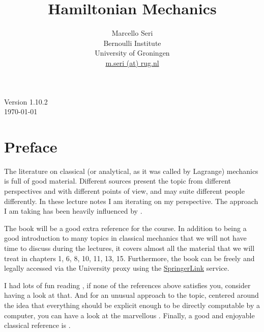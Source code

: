 \documentclass[english,fontsize=11pt,paper=a5,oneside]{scrbook}
\title{Hamiltonian Mechanics}
\author{Marcello Seri\\
\small{Bernoulli Institute}\vspace{-.2cm}\\
\small{University of Groningen}\vspace{-.2cm}\\
\small\href{mailto:m.seri@rug.nl}{m.seri (at) rug.nl}
}
\date{}
\theoremstyle{definition}
\def\biblio{}
\begin{document}
\def\biblio{}

\maketitle

\cleardoublepage

\thispagestyle{empty}
\null\vfill
\begin{center}
  Version 1.10.2\\
  \today
\end{center}
\vfill
\small{\doclicenseThis}

\cleardoublepage

\tableofcontents

\cleardoublepage

\chapter*{Preface}

The literature on classical (or analytical, as it was called by Lagrange) mechanics is full of good material.
Different sources present the topic from different perspectives and with different points of view, and may suite different people differently.
In these lecture notes I am iterating on my perspective.
The approach I am taking has been heavily influenced by \cite{book:arnold, book:knauf, lectures:dubrovin, book:lowenstein, book:marsdenratiu, lectures:tong, landau1976mechanics}.

The book \cite{book:knauf} will be a good extra reference for the course. In addition to being a good introduction to many topics in classical mechanics that we will not have time to discuss during the lectures, it covers almost all the material that we will treat in chapters 1, 6, 8, 10, 11, 13, 15. Furthermore, the book can be freely and legally accessed via the University proxy using the \href{https://link.springer.com/book/10.1007%2F978-3-662-55774-7}{SpringerLink} service.

I had lots of fun reading \cite{schwichtenberg2019no}, if none of the references above satisfies you, consider having a look at that. And for an unusual approach to the topic, centered around the idea that everything should be explicit enough to be directly computable by a computer, you can have a look at the marvellous \cite{book:sicm}. Finally, a good and enjoyable classical reference is \cite{goldstein2013classical}.\medskip
\end{document}
